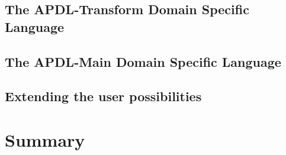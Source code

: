 \subsection{The APDL-Transform Domain Specific Language}
\label{subsec:transformation_dsl}

\subsection{The APDL-Main Domain Specific Language}
\label{subsec:apdl_main_dsl}

\subsection{Extending the user possibilities}
\label{subsec:extending_user_possibilities}

\section{Summary}
\label{sec:design_summary}

